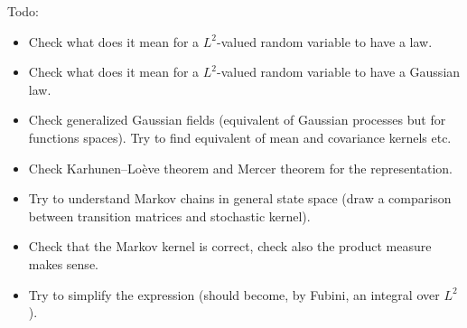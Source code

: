 \documentclass{article}
\begin{document}
Todo:
\begin{itemize}
    \item Check what does it mean for a $L^2$-valued random variable to have a law.
    \item Check what does it mean for a $L^2$-valued random variable to have a Gaussian law.
    \item Check generalized Gaussian fields (equivalent of Gaussian processes but for functions spaces). Try to find equivalent of mean and covariance kernels etc.
    \item Check Karhunen–Loève theorem and Mercer theorem for the representation.
    \item Try to understand Markov chains in general state space (draw a comparison between transition matrices and stochastic kernel).
    \item Check that the Markov kernel is correct, check also the product measure makes sense.
    \item Try to simplify the expression (should become, by Fubini, an integral over $L^2$).
\end{itemize}
\end{document}
